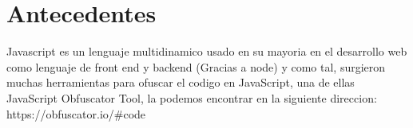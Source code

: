 \section{Antecedentes}
Javascript es un lenguaje multidinamico usado en su mayoria en el desarrollo web como lenguaje de front end y backend (Gracias a node) y como tal, surgieron muchas herramientas para ofuscar el codigo en JavaScript, una de ellas JavaScript Obfuscator Tool, la podemos encontrar en la siguiente direccion: https://obfuscator.io/#code
